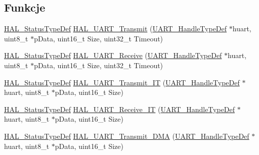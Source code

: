 \subsection*{Funkcje}
\begin{DoxyCompactItemize}
\item 
\hyperlink{stm32f4xx__hal__def_8h_a63c0679d1cb8b8c684fbb0632743478f}{H\+A\+L\+\_\+\+Status\+Type\+Def} \hyperlink{group___u_a_r_t___exported___functions___group2_ga210329848c1873957034e129ccf8944e}{H\+A\+L\+\_\+\+U\+A\+R\+T\+\_\+\+Transmit} (\hyperlink{group___u_a_r_t___exported___types_ga7adf4f3e4c3ecde572be5925c915a967}{U\+A\+R\+T\+\_\+\+Handle\+Type\+Def} $\ast$huart, uint8\+\_\+t $\ast$p\+Data, uint16\+\_\+t Size, uint32\+\_\+t Timeout)
\item 
\hyperlink{stm32f4xx__hal__def_8h_a63c0679d1cb8b8c684fbb0632743478f}{H\+A\+L\+\_\+\+Status\+Type\+Def} \hyperlink{group___u_a_r_t___exported___functions___group2_gab868edc590e3b827a14528a25c999e2f}{H\+A\+L\+\_\+\+U\+A\+R\+T\+\_\+\+Receive} (\hyperlink{group___u_a_r_t___exported___types_ga7adf4f3e4c3ecde572be5925c915a967}{U\+A\+R\+T\+\_\+\+Handle\+Type\+Def} $\ast$huart, uint8\+\_\+t $\ast$p\+Data, uint16\+\_\+t Size, uint32\+\_\+t Timeout)
\item 
\hyperlink{stm32f4xx__hal__def_8h_a63c0679d1cb8b8c684fbb0632743478f}{H\+A\+L\+\_\+\+Status\+Type\+Def} \hyperlink{group___u_a_r_t___exported___functions___group2_gaf223f2bcc2f5734f147cc5c626d757b0}{H\+A\+L\+\_\+\+U\+A\+R\+T\+\_\+\+Transmit\+\_\+\+IT} (\hyperlink{group___u_a_r_t___exported___types_ga7adf4f3e4c3ecde572be5925c915a967}{U\+A\+R\+T\+\_\+\+Handle\+Type\+Def} $\ast$huart, uint8\+\_\+t $\ast$p\+Data, uint16\+\_\+t Size)
\item 
\hyperlink{stm32f4xx__hal__def_8h_a63c0679d1cb8b8c684fbb0632743478f}{H\+A\+L\+\_\+\+Status\+Type\+Def} \hyperlink{group___u_a_r_t___exported___functions___group2_gadc0c3ef2109881d011601f0d41e70e40}{H\+A\+L\+\_\+\+U\+A\+R\+T\+\_\+\+Receive\+\_\+\+IT} (\hyperlink{group___u_a_r_t___exported___types_ga7adf4f3e4c3ecde572be5925c915a967}{U\+A\+R\+T\+\_\+\+Handle\+Type\+Def} $\ast$huart, uint8\+\_\+t $\ast$p\+Data, uint16\+\_\+t Size)
\item 
\hyperlink{stm32f4xx__hal__def_8h_a63c0679d1cb8b8c684fbb0632743478f}{H\+A\+L\+\_\+\+Status\+Type\+Def} \hyperlink{group___u_a_r_t___exported___functions___group2_ga039ce4af3997f11f55c3c92d043cce77}{H\+A\+L\+\_\+\+U\+A\+R\+T\+\_\+\+Transmit\+\_\+\+D\+MA} (\hyperlink{group___u_a_r_t___exported___types_ga7adf4f3e4c3ecde572be5925c915a967}{U\+A\+R\+T\+\_\+\+Handle\+Type\+Def} $\ast$huart, uint8\+\_\+t $\ast$p\+Data, uint16\+\_\+t Size)

\end{DoxyCompactItemize}
